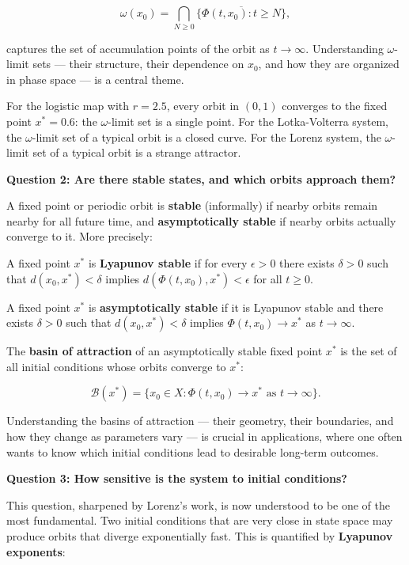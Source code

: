 \[
\omega(x_0) = \bigcap_{N \geq 0} \overline{\{\Phi(t, x_0) : t \geq N\}},
\]

captures the set of accumulation points of the orbit as $t \to \infty$. Understanding $\omega$-limit sets --- their structure, their dependence on $x_0$, and how they are organized in phase space --- is a central theme.

For the logistic map with $r = 2.5$, every orbit in $(0,1)$ converges to the fixed point $x^* = 0.6$: the $\omega$-limit set is a single point. For the Lotka-Volterra system, the $\omega$-limit set of a typical orbit is a closed curve. For the Lorenz system, the $\omega$-limit set of a typical orbit is a strange attractor.

\textbf{Question 2: Are there stable states, and which orbits approach them?}

A fixed point or periodic orbit is \textbf{stable} (informally) if nearby orbits remain nearby for all future time, and \textbf{asymptotically stable} if nearby orbits actually converge to it. More precisely:

\begin{definition}\label{def:1.5}
A fixed point $x^*$ is \textbf{Lyapunov stable} if for every $\epsilon > 0$ there exists $\delta > 0$ such that $d(x_0, x^*) < \delta$ implies $d(\Phi(t, x_0), x^*) < \epsilon$ for all $t \geq 0$.
\end{definition}


\begin{definition}\label{def:1.6}
A fixed point $x^*$ is \textbf{asymptotically stable} if it is Lyapunov stable and there exists $\delta > 0$ such that $d(x_0, x^*) < \delta$ implies $\Phi(t, x_0) \to x^*$ as $t \to \infty$.

The \textbf{basin of attraction} of an asymptotically stable fixed point $x^*$ is the set of all initial conditions whose orbits converge to $x^*$:

\[
\mathcal{B}(x^*) = \{x_0 \in X : \Phi(t, x_0) \to x^* \text{ as } t \to \infty\}.
\]

Understanding the basins of attraction --- their geometry, their boundaries, and how they change as parameters vary --- is crucial in applications, where one often wants to know which initial conditions lead to desirable long-term outcomes.

\textbf{Question 3: How sensitive is the system to initial conditions?}

This question, sharpened by Lorenz's work, is now understood to be one of the most fundamental. Two initial conditions that are very close in state space may produce orbits that diverge exponentially fast. This is quantified by \textbf{Lyapunov exponents}:
\end{definition}



